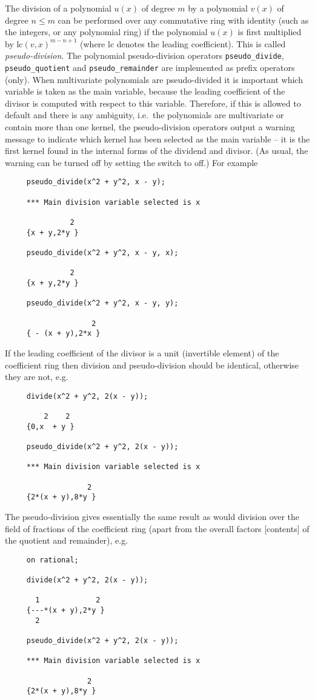 The division of a polynomial $u(x)$ of degree $m$ by a polynomial
$v(x)$ of degree $n \le m$ can be performed over any commutative ring
with identity (such as the integers, or any polynomial ring) if the
polynomial $u(x)$ is first multiplied by $\mathrm{lc}(v,x)^{m-n+1}$
(where lc denotes the leading coefficient).  This is called
\emph{pseudo-division}.  The polynomial pseudo-division operators
\texttt{pseudo\_divide}, \texttt{pseudo\_quotient} and
\texttt{pseudo\_remainder} are implemented as prefix operators (only).
When multivariate polynomials are pseudo-divided it is important which
variable is taken as the main variable, because the leading
coefficient of the divisor is computed with respect to this variable.
Therefore, if this is allowed to default and there is any ambiguity,
i.e.\ the polynomials are multivariate or contain more than one
kernel, the pseudo-division operators output a warning message to
indicate which kernel has been selected as the main variable -- it is
the first kernel found in the internal forms of the dividend and
divisor.  (As usual, the warning can be turned off by setting the
switch  to off.)  For example
\begin{verbatim}
     pseudo_divide(x^2 + y^2, x - y);

     *** Main division variable selected is x 

               2
     {x + y,2*y }

     pseudo_divide(x^2 + y^2, x - y, x);

               2
     {x + y,2*y }

     pseudo_divide(x^2 + y^2, x - y, y);

                    2
     { - (x + y),2*x }
\end{verbatim}

If the leading coefficient of the divisor is a unit (invertible
element) of the coefficient ring then division and pseudo-division
should be identical, otherwise they are not, e.g.
\begin{verbatim}
     divide(x^2 + y^2, 2(x - y));

         2    2
     {0,x  + y }

     pseudo_divide(x^2 + y^2, 2(x - y));

     *** Main division variable selected is x

                   2
     {2*(x + y),8*y }
\end{verbatim}

The pseudo-division gives essentially the same result as would
division over the field of fractions of the coefficient ring (apart
from the overall factors [contents] of the quotient and remainder),
e.g.
\begin{verbatim}
     on rational;

     divide(x^2 + y^2, 2(x - y));

       1             2
     {---*(x + y),2*y }
       2

     pseudo_divide(x^2 + y^2, 2(x - y));

     *** Main division variable selected is x

                   2
     {2*(x + y),8*y }
\end{verbatim}

